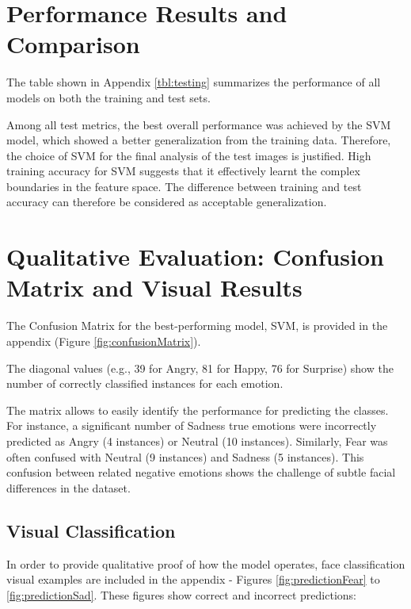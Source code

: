 \section{Performance Results and Comparison}

The table shown in Appendix \ref{tbl:testing} summarizes the performance of all models on both the training and test sets.

Among all test metrics, the best overall performance was achieved by the SVM model, which showed a better generalization from the training data. Therefore, the choice of SVM for the final analysis of the test images is justified. High training accuracy for SVM suggests that it effectively learnt the complex boundaries in the feature space. The difference between training and test accuracy can therefore be considered as acceptable generalization.
\newline

\section{Qualitative Evaluation: Confusion Matrix and Visual Results}

The Confusion Matrix for the best-performing model, SVM, is provided in the appendix (Figure \ref{fig:confusionMatrix}).

The diagonal values (e.g., 39 for Angry, 81 for Happy, 76 for Surprise) show the number of correctly classified instances for each emotion.

The matrix allows to easily identify the performance for predicting the classes. For instance, a significant number of Sadness true emotions were incorrectly predicted as Angry (4 instances) or Neutral (10 instances). Similarly, Fear was often confused with Neutral (9 instances) and Sadness (5 instances). This confusion between related negative emotions shows the challenge of subtle facial differences in the dataset.
\newline

\subsection{Visual Classification}

In order to provide qualitative proof of how the model operates, face classification visual examples are included in the appendix - Figures \ref{fig:predictionFear} to \ref{fig:predictionSad}. These figures show correct and incorrect predictions:

